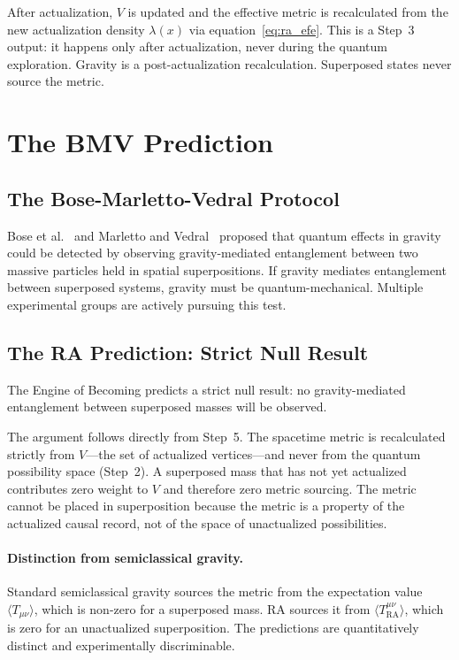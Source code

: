 \documentclass[11pt,a4paper]{article}
\theoremstyle{plain}
\theoremstyle{definition}
\theoremstyle{remark}
\newcommand{\Tact}{T^{\mu\nu}_{\mathrm{RA}}}
\begin{document}
\begin{description}[leftmargin=1.5em, itemsep=6pt]
  \item[\textbf{Step 5 --- The Hydrodynamic Limit (Level~3).}]
  After actualization, $V$ is updated and the effective metric is
  recalculated from the new actualization density $\lambda(x)$ via
  equation~\eqref{eq:ra_efe}. This is a Step~3 output: it happens only
  after actualization, never during the quantum exploration. Gravity is
  a post-actualization recalculation. Superposed states never source the
  metric.
\end{description}

\section{The BMV Prediction}
\label{sec:bmv}

\subsection{The Bose-Marletto-Vedral Protocol}

Bose et al.~\citep{Bose2017} and Marletto and Vedral~\citep{Marletto2017}
proposed that quantum effects in gravity could be detected by observing
gravity-mediated entanglement between two massive particles held in spatial
superpositions. If gravity mediates entanglement between superposed systems,
gravity must be quantum-mechanical. Multiple experimental groups are actively
pursuing this test.

\subsection{The RA Prediction: Strict Null Result}

The Engine of Becoming predicts a strict null result: no gravity-mediated
entanglement between superposed masses will be observed.

The argument follows directly from Step~5. The spacetime metric is recalculated
strictly from $V$---the set of actualized vertices---and never from the quantum
possibility space (Step~2). A superposed mass that has not yet actualized
contributes zero weight to $V$ and therefore zero metric sourcing. The metric
cannot be placed in superposition because the metric is a property of the
actualized causal record, not of the space of unactualized possibilities.

\paragraph{Distinction from semiclassical gravity.}
Standard semiclassical gravity sources the metric from the expectation value
$\langle T_{\mu\nu}\rangle$, which is non-zero for a superposed mass. RA
sources it from $\langle\Tact\rangle$, which is zero for an unactualized
superposition. The predictions are quantitatively distinct and experimentally
discriminable.
\end{document}
